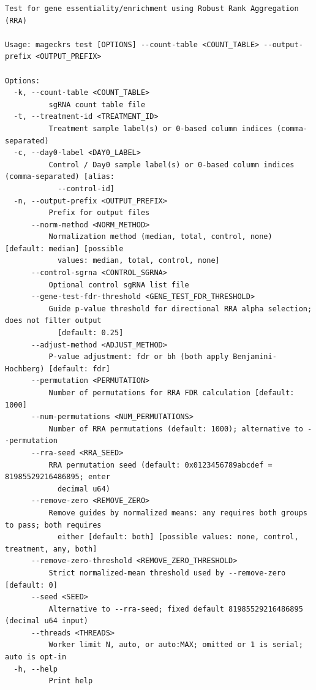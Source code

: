 \documentclass[11pt,a4paper]{article}
\makeatletter
\renewcommand\subsection{\@startsection{subsection}{2}{\z@}{-2.5ex plus -.8ex minus -.2ex}{.8ex plus .2ex}{\normalfont\large\bfseries\color{ManualBlue}}}
\makeatother
\begin{document}
\begin{verbatim}
Test for gene essentiality/enrichment using Robust Rank Aggregation (RRA)

Usage: mageckrs test [OPTIONS] --count-table <COUNT_TABLE> --output-prefix <OUTPUT_PREFIX>

Options:
  -k, --count-table <COUNT_TABLE>
          sgRNA count table file
  -t, --treatment-id <TREATMENT_ID>
          Treatment sample label(s) or 0-based column indices (comma-separated)
  -c, --day0-label <DAY0_LABEL>
          Control / Day0 sample label(s) or 0-based column indices (comma-separated) [alias:
            --control-id]
  -n, --output-prefix <OUTPUT_PREFIX>
          Prefix for output files
      --norm-method <NORM_METHOD>
          Normalization method (median, total, control, none) [default: median] [possible
            values: median, total, control, none]
      --control-sgrna <CONTROL_SGRNA>
          Optional control sgRNA list file
      --gene-test-fdr-threshold <GENE_TEST_FDR_THRESHOLD>
          Guide p-value threshold for directional RRA alpha selection; does not filter output
            [default: 0.25]
      --adjust-method <ADJUST_METHOD>
          P-value adjustment: fdr or bh (both apply Benjamini-Hochberg) [default: fdr]
      --permutation <PERMUTATION>
          Number of permutations for RRA FDR calculation [default: 1000]
      --num-permutations <NUM_PERMUTATIONS>
          Number of RRA permutations (default: 1000); alternative to --permutation
      --rra-seed <RRA_SEED>
          RRA permutation seed (default: 0x0123456789abcdef = 81985529216486895; enter
            decimal u64)
      --remove-zero <REMOVE_ZERO>
          Remove guides by normalized means: any requires both groups to pass; both requires
            either [default: both] [possible values: none, control, treatment, any, both]
      --remove-zero-threshold <REMOVE_ZERO_THRESHOLD>
          Strict normalized-mean threshold used by --remove-zero [default: 0]
      --seed <SEED>
          Alternative to --rra-seed; fixed default 81985529216486895 (decimal u64 input)
      --threads <THREADS>
          Worker limit N, auto, or auto:MAX; omitted or 1 is serial; auto is opt-in
  -h, --help
          Print help
\end{verbatim}

\subsection{run}\label{run}
\end{document}

